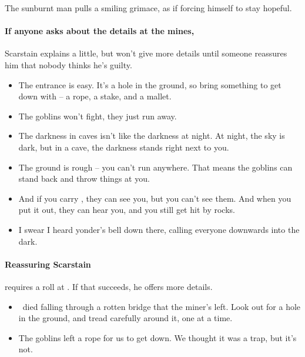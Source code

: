 \begin{multicols}{2}
\begin{boxtext}
  The sunburnt man pulls a smiling grimace, as if forcing himself to stay hopeful.
\end{boxtext}

\paragraph{If anyone asks about the details at the mines,}
Scarstain explains a little, but won't give more details until someone reassures him that nobody thinks he's guilty.

\begin{speechtext}
  \begin{itemize}
    \item
    The entrance is easy.
    It's a hole in the ground, so bring something to get down with -- a rope, a stake, and a mallet.
    \item
    The goblins won't fight, they just run away.
    \item
    The darkness in caves isn't like the darkness at night.
    At night, the sky is dark, but in a cave, the darkness stands right next to you.
    \item
    The ground is rough -- you can't run anywhere.
    That means the goblins can stand back and throw things at you.
    \item
    And if you carry , they can see you, but you can't see them.
    And when you put it out, they can hear you, and you still get hit by rocks.
    \item
    I swear I heard \gls{yonder}'s bell down there, calling everyone downwards into the dark.
  \end{itemize}
\end{speechtext}

\paragraph{Reassuring Scarstain}
requires a  roll at \tn[10].
If that succeeds, he offers more details.

\begin{speechtext}
  \begin{itemize}
    \item
    \composeHumanName\ died falling through a rotten bridge that the miner's left.
    Look out for a hole in the ground, and tread carefully around it, one at a time.
    
    \item
    The goblins left a rope for us to get down.
    We thought it was a trap, but it's not.
    

\end{itemize}
\end{speechtext}
\end{multicols}
